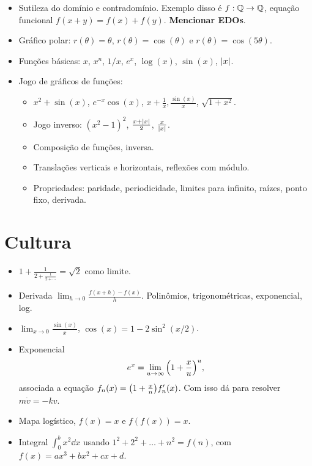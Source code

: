 \documentclass[a4paper,fleqn,12pt]{article}
\begin{document}
\begin{itemize}
\item Sutileza do domínio e contradomínio. Exemplo disso é $f:\mathbb{Q} \to \mathbb{Q}$, equação funcional $f(x+y) = f(x) + f(y)$. \textbf{Mencionar EDOs}.
\item Gráfico polar: $r(\theta) = \theta$, $r(\theta) = \cos(\theta)$ e $r(\theta) = \cos(5\theta)$.
\item Funções básicas: $x$, $x^n$, $1/x$, $e^x$, $\log(x)$, $\sin(x)$, $\abs{x}$.
\item Jogo de gráficos de funções:
\begin{itemize}
\item $x^2 + \sin(x)$, $e^{-x} \cos(x)$, $x + \frac{1}{x}, \frac{\sin(x)}{x}$, $\sqrt{1+x^2}$.
\item Jogo inverso: $(x^2 - 1)^2$, $\frac{x + \abs{x}}{2}$, $\frac{x}{\abs{x}}$.
\item Composição de funções, inversa.
\item Translações verticais e horizontais, reflexões com módulo.
\item Propriedades: paridade, periodicidade, limites para infinito, raízes, ponto fixo, derivada.
\end{itemize}
\end{itemize}


\section{Cultura}

\begin{itemize}
\item $1 + \frac{1}{2 + \frac{1}{2 + \cdots}} = \sqrt{2}$ como limite.
\item Derivada $\lim_{h \to 0} \frac{f(x+h) - f(x)}{h}$. Polinômios, trigonométricas, exponencial, log.
\item $\lim_{x \to 0} \frac{\sin(x)}{x}$, $\cos(x) = 1 - 2 \sin^2(x/2)$.
\item Exponencial
$$
e^x = \lim_{u \to \infty} \qty(1 + \frac{x}{u})^u,
$$
associada a equação $f_n(x) = \qty(1 + \frac{x}{n}) f_n'(x)$. Com isso dá para resolver $m \dot{v} = -k v$.
\item Mapa logístico, $f(x) = x$ e $f(f(x)) = x$.
\item Integral $\int_0^b x^2 \dd{x}$ usando $1^2 + 2^2 + \ldots + n^2 = f(n)$, com $f(x) = ax^3 + bx^2 + cx + d$.
\end{itemize}
\end{document}
